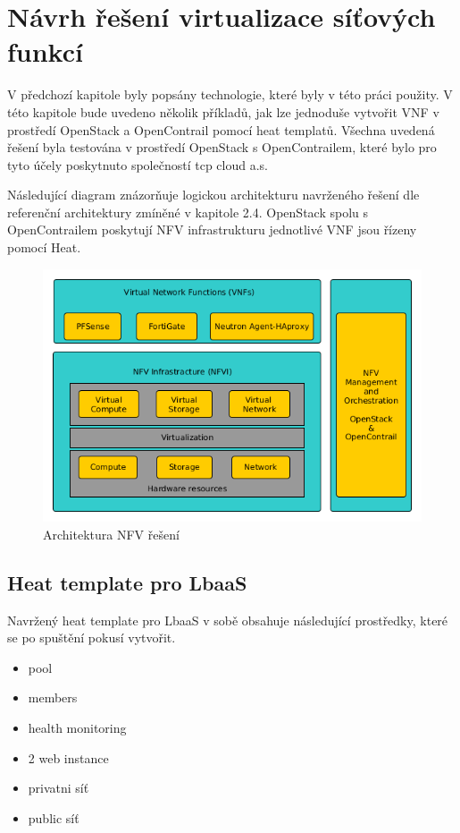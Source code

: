 \chapter{Návrh řešení virtualizace síťových funkcí}

V předchozí kapitole byly popsány technologie, které byly v této práci použity. V této kapitole bude uvedeno několik příkladů, jak lze jednoduše vytvořit VNF v prostředí OpenStack a OpenContrail pomocí heat templatů. Všechna uvedená řešení byla testována v prostředí OpenStack s OpenContrailem, které bylo pro tyto účely poskytnuto společností tcp cloud a.s.


Následující diagram znázorňuje logickou architekturu navrženého řešení dle referenční architektury zmíněné v kapitole 2.4. OpenStack spolu s OpenContrailem poskytují NFV infrastrukturu jednotlivé VNF jsou řízeny pomocí Heat.

\begin{figure}[h]
\begin{centering}
\includegraphics[scale=0.51]{images/VNF_overview}
\par\end{centering}
\caption{Architektura NFV řešení\label{fig:VNF_overview}}
\end{figure}

\section{Heat template pro LbaaS}\label{sub:interaction}

Navržený heat template pro LbaaS v sobě obsahuje následující prostředky, které se po spuštění pokusí vytvořit.

\begin{itemize}
\item pool
\item members
\item health monitoring
\item 2 web instance
\item privatni síť
\item public síť
\end{itemize}

